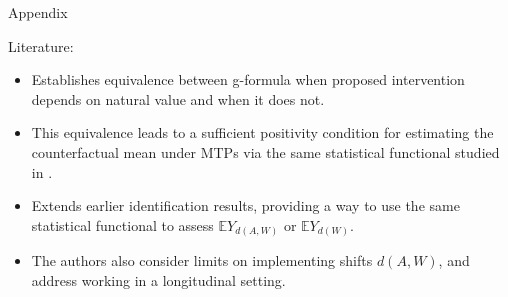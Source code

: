 \documentclass{beamer}
\newcommand{\E}{\mathbb{E}}
\begin{document}

\appendix
\begin{frame}[standout]
  Appendix
\end{frame}


\begin{frame}[c]{Literature: \cite{young2014identification}}

\begin{center}
\begin{itemize}
  \itemsep10pt
  \item Establishes equivalence between g-formula when proposed intervention
    depends on natural value and when it does not.
  \item This equivalence leads to a sufficient positivity condition for
    estimating the counterfactual mean under MTPs via the same statistical
    functional studied in \cite{diaz2012population}.
  \item Extends earlier identification results, providing a way to use the same
    statistical functional to assess $\E Y_{d(A,W)}$ or $\E Y_{d(W)}$.
  \item The authors also consider limits on implementing shifts $d(A,W)$, and
    address working in a longitudinal setting.
\end{itemize}
\end{center}

\note{
}

\end{frame}

\end{document}
